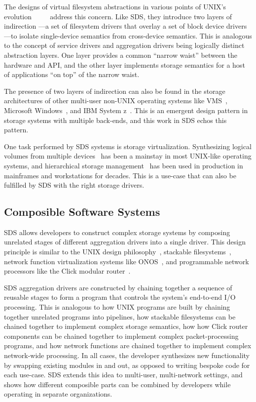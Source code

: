 The designs of virtual filesystem abstractions in various points of UNIX's evolution
~\cite{vnodes-sun-1986}~\cite{netbsd4.4-vfs-1995}~\cite{plan9-filesystem}~\cite{freebsd-design-book}
address this concern.  Like SDS, they introduce two layers of indirection
---a set of filesystem drivers that overlay a set of block device drivers---to
isolate single-device semantics from cross-device semantics.  This is analogous
to the concept of service drivers and aggregation drivers being logically
distinct abstraction layers.  One layer provides a common ``narrow waist''
between the hardware and API, and the other layer implements storage semantics
for a host of applications ``on top'' of the narrow waist.

The presence of two layers of indirection can also be found in the storage
architectures of other multi-user non-UNIX
operating systems like VMS~\cite{vms-driver-model}, Microsoft
Windows~\cite{ms-windows-driver-model}, and IBM System z~\cite{ibm-vsam}.
This is an emergent design pattern in storage systems with multiple
back-ends, and this work in SDS echos this pattern.

One task performed by SDS systems is storage virtualization.  Synthesizing
logical volumes from multiple devices~\cite{lvm} has been a mainstay in most UNIX-like
operating systems, and hierarchical storage management~\cite{hp-hsm} has been used
in production in mainframes and workstations for decades.  This is a use-case that can also be
fulfilled by SDS with the right storage drivers.

\subsection{Composible Software Systems}

SDS allows developers to construct complex storage systems by composing
unrelated stages of different aggregation drivers into a single driver.
This design principle is similar to the UNIX design philosophy~\cite{unix-design-philosophy},
stackable filesystems~\cite{stackable-filesystems}, network function virtualization systems
like ONOS~\cite{onos},
and programmable network processors like the Click modular router~\cite{click-modular-router}.

SDS aggregation drivers are constructed by chaining together a sequence of
reusable stages to form a program that controls the system's
end-to-end I/O processing.  This is analogous to how UNIX programs are built
by chaining together unrelated programs into pipelines, how stackable
filesystems can be chained together to implement complex storage semantics, how
how Click router components can be chained together to implement complex
packet-processing programs, and how network functions are chained together to
implement complex network-wide processing.
In all cases, the developer synthesizes new functionality by swapping existing
modules in and out, as opposed to writing bespoke code for each use-case.
SDS extends this idea to multi-user, multi-network settings, and shows how different
composible parts can be combined by developers
while operating in separate organizations.

